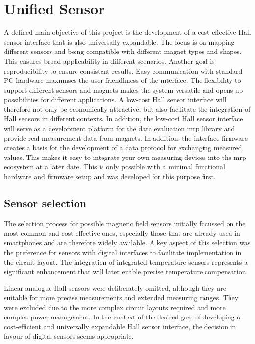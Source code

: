 \hypertarget{unified-sensor}{%
\chapter{Unified Sensor}\label{unified-sensor}}

A defined main objective of this project is the development of a
cost-effective Hall sensor interface that is also universally
expandable. The focus is on mapping different sensors and being
compatible with different magnet types and shapes. This ensures broad
applicability in different scenarios. Another goal is reproducibility to
ensure consistent results. Easy communication with standard PC hardware
maximises the user-friendliness of the interface. The flexibility to
support different sensors and magnets makes the system versatile and
opens up possibilities for different applications. A low-cost Hall
sensor interface will therefore not only be economically attractive, but
also facilitate the integration of Hall sensors in different contexts.
In addition, the low-cost Hall sensor interface will serve as a
development platform for the data evaluation \gls{mrp} library and
provide real measurement data from magnets. In addition, the interface
firmware creates a basis for the development of a data protocol for
exchanging measured values. This makes it easy to integrate your own
measuring devices into the \gls{mrp} ecosystem at a later date. This is
only possible with a minimal functional hardware and firmware setup and
was developed for this purpose first.

\hypertarget{sensor-selection}{%
\section{Sensor selection}\label{sensor-selection}}

The selection process for possible magnetic field sensors initially
focussed on the most common and cost-effective ones, especially those
that are already used in smartphones and are therefore widely available.
A key aspect of this selection was the preference for sensors with
digital interfaces to facilitate implementation in the circuit layout.
The integration of integrated temperature sensors represents a
significant enhancement that will later enable precise temperature
compensation.

Linear analogue Hall sensors were deliberately omitted, although they
are suitable for more precise measurements and extended measuring
ranges. They were excluded due to the more complex circuit layouts
required and more complex power management. In the context of the
desired goal of developing a cost-efficient and universally expandable
Hall sensor interface, the decision in favour of digital sensors seems
appropriate.

